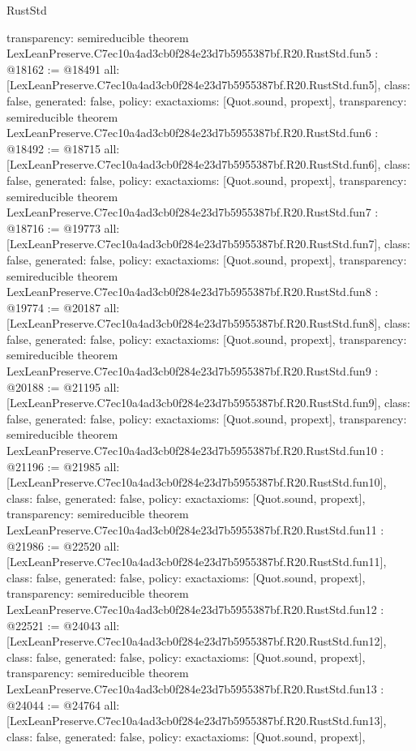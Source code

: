 \begin{lexlean}{RustStd}
\begin{coremodule}
{  transparency: semireducible
}
theorem LexLeanPreserve.C7ec10a4ad3cb0f284e23d7b5955387bf.R20.RustStd.fun5 : @18162 := @18491 {
  all: [LexLeanPreserve.C7ec10a4ad3cb0f284e23d7b5955387bf.R20.RustStd.fun5],
  class: false,
  generated: false,
  policy: exact{axioms: [Quot.sound, propext]},
  transparency: semireducible
}
theorem LexLeanPreserve.C7ec10a4ad3cb0f284e23d7b5955387bf.R20.RustStd.fun6 : @18492 := @18715 {
  all: [LexLeanPreserve.C7ec10a4ad3cb0f284e23d7b5955387bf.R20.RustStd.fun6],
  class: false,
  generated: false,
  policy: exact{axioms: [Quot.sound, propext]},
  transparency: semireducible
}
theorem LexLeanPreserve.C7ec10a4ad3cb0f284e23d7b5955387bf.R20.RustStd.fun7 : @18716 := @19773 {
  all: [LexLeanPreserve.C7ec10a4ad3cb0f284e23d7b5955387bf.R20.RustStd.fun7],
  class: false,
  generated: false,
  policy: exact{axioms: [Quot.sound, propext]},
  transparency: semireducible
}
theorem LexLeanPreserve.C7ec10a4ad3cb0f284e23d7b5955387bf.R20.RustStd.fun8 : @19774 := @20187 {
  all: [LexLeanPreserve.C7ec10a4ad3cb0f284e23d7b5955387bf.R20.RustStd.fun8],
  class: false,
  generated: false,
  policy: exact{axioms: [Quot.sound, propext]},
  transparency: semireducible
}
theorem LexLeanPreserve.C7ec10a4ad3cb0f284e23d7b5955387bf.R20.RustStd.fun9 : @20188 := @21195 {
  all: [LexLeanPreserve.C7ec10a4ad3cb0f284e23d7b5955387bf.R20.RustStd.fun9],
  class: false,
  generated: false,
  policy: exact{axioms: [Quot.sound, propext]},
  transparency: semireducible
}
theorem LexLeanPreserve.C7ec10a4ad3cb0f284e23d7b5955387bf.R20.RustStd.fun10 : @21196 := @21985 {
  all: [LexLeanPreserve.C7ec10a4ad3cb0f284e23d7b5955387bf.R20.RustStd.fun10],
  class: false,
  generated: false,
  policy: exact{axioms: [Quot.sound, propext]},
  transparency: semireducible
}
theorem LexLeanPreserve.C7ec10a4ad3cb0f284e23d7b5955387bf.R20.RustStd.fun11 : @21986 := @22520 {
  all: [LexLeanPreserve.C7ec10a4ad3cb0f284e23d7b5955387bf.R20.RustStd.fun11],
  class: false,
  generated: false,
  policy: exact{axioms: [Quot.sound, propext]},
  transparency: semireducible
}
theorem LexLeanPreserve.C7ec10a4ad3cb0f284e23d7b5955387bf.R20.RustStd.fun12 : @22521 := @24043 {
  all: [LexLeanPreserve.C7ec10a4ad3cb0f284e23d7b5955387bf.R20.RustStd.fun12],
  class: false,
  generated: false,
  policy: exact{axioms: [Quot.sound, propext]},
  transparency: semireducible
}
theorem LexLeanPreserve.C7ec10a4ad3cb0f284e23d7b5955387bf.R20.RustStd.fun13 : @24044 := @24764 {
  all: [LexLeanPreserve.C7ec10a4ad3cb0f284e23d7b5955387bf.R20.RustStd.fun13],
  class: false,
  generated: false,
  policy: exact{axioms: [Quot.sound, propext]},
}
\end{coremodule}
\end{lexlean}
